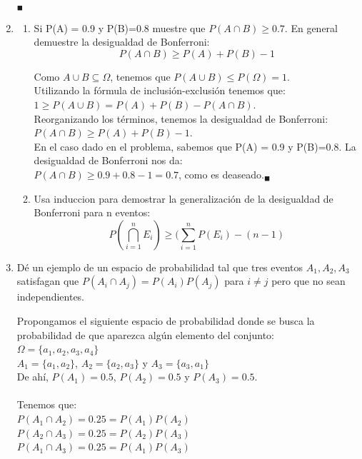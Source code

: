 \documentclass[12pt,a4paper]{report}
\begin{document}
\begin{enumerate}
{\begin{enumerate}[label=\Roman*.]
{		\begin{flushright}
			$_{\blacksquare}$
		\end{flushright}
	}
	\end{enumerate}


	}

   \item {
  	\begin{enumerate}[label=\alph*) ]
   \item {
	Si P(A) = 0.9 y P(B)=0.8 muestre que $P(A \cap B) \geq 0.7$. En general demuestre la desigualdad de Bonferroni:\\
	$$P(A \cap B) \geq P(A)+P(B) -1$$
	
	Como $A \cup B \subseteq \Omega$, tenemos que $ P(A \cup B) \leq P(\Omega) = 1$.\\
	Utilizando la fórmula de inclusión-exclusión tenemos que:\\
	$1 \geq P(A \cup B) = P(A) + P(B) - P(A \cap B)$.\\
	Reorganizando los términos, tenemos la desigualdad de Bonferroni: $P(A \cap B) \geq P(A)+P(B) -1$.\\
	En el caso dado en el problema, sabemos que P(A) = 0.9 y P(B)=0.8. La desigualdad de Bonferroni nos da:\\
	 $P(A \cap B) \geq 0.9 + 0.8 -1 = 0.7$, como es deaseado.$_{\blacksquare}$ 	
   }

   \item {
 Usa induccion para demostrar la generalización de la desigualdad de Bonferroni para n eventos:\\
 $$P(\bigcap\limits_{i=1}^{n} E_{i}) \geq (\sum_{i=1}^{n} P(E_{i})-(n-1)$$

   }




	\end{enumerate}
	}

  \item{
  Dé un ejemplo de un espacio de probabilidad tal que tres eventos $A_{1},A_{2},A_{3}$ satisfagan que $P(A_{i} \cap A_{j})=P(A_{i})P(A_{j})$ para $i\neq j$ pero que no sean independientes.

  Propongamos el siguiente espacio de probabilidad donde se busca la probabilidad de que aparezca algún elemento del conjunto:\\
  $\Omega = \lbrace a_{1}, a_{2}, a_{3}, a_{4} \rbrace$\\
  $A_{1} = \lbrace a_{1}, a_{2} \rbrace$, $A_{2} = \lbrace a_{2}, a_{3} \rbrace$ y $A_{3} =  \lbrace a_{3}, a_{1} \rbrace$\\
  De ahí, $P(A_{1}) = 0.5$, $P(A_{2}) = 0.5$ y $P(A_{3}) = 0.5$.\\\\
  Tenemos que:\\
  $P(A_{1} \cap A_{2}) = 0.25 = P(A_{1})P(A_{2})$\\
  $P(A_{2} \cap A_{3}) = 0.25 = P(A_{2})P(A_{3})$\\
  $P(A_{1} \cap A_{3}) = 0.25 = P(A_{1})P(A_{3})$\\

}
\end{enumerate}
\end{document}
